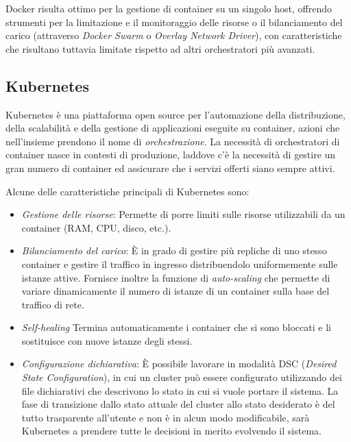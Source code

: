 	Docker risulta ottimo per la gestione di container su un singolo host, offrendo strumenti per la limitazione e il monitoraggio delle risorse o il bilanciamento del carico (attraverso \emph{Docker Swarm} o \emph{Overlay Network Driver}), con caratteristiche che risultano tuttavia limitate rispetto ad altri orchestratori più avanzati\cite{site:kube_better_docker}.
	
	
\subsection{Kubernetes}
	\label{sec:kubernetes}
	
	Kubernetes è una piattaforma open source per l'automazione della distribuzione, della scalabilità e della gestione di applicazioni eseguite su container, azioni che nell'insieme prendono il nome di \emph{orchestrazione}.
	La necessità di orchestratori di container nasce in contesti di produzione, laddove c'è la necessità di gestire un gran numero di container ed assicurare che i servizi offerti siano sempre attivi\cite{doc:docker-overview}.

	Alcune delle caratteristiche principali di Kubernetes sono:
	\begin{itemize}
		\item \emph{Gestione delle risorse}:
			Permette di porre limiti sulle risorse utilizzabili da un container (RAM, CPU, disco, etc.).
		
		\item \emph{Bilanciamento del carico}:
			\`E in grado di gestire più repliche di uno stesso container e gestire il traffico in ingresso distribuendolo uniformemente sulle istanze attive.
			Fornisce inoltre la funzione di \emph{auto-scaling} che permette di variare dinamicamente il numero di istanze di un container sulla base del traffico di rete.
			
		\item \emph{Self-healing}
			Termina automaticamente i container che si sono bloccati e li sostituisce con nuove istanze degli stessi.
			
		\item \emph{Configurazione dichiarativa}:
			\`E possibile lavorare in modalità DSC (\emph{Desired State Configuration}), in cui un cluster può essere configurato utilizzando dei file dichiarativi che descrivono lo stato in cui si vuole portare il sistema.
			La fase di transizione dallo stato attuale del cluster allo stato desiderato è del tutto trasparente all'utente e non è in alcun modo modificabile, sarà Kubernetes a prendere tutte le decisioni in merito  evolvendo il sistema.
	\end{itemize}
	
